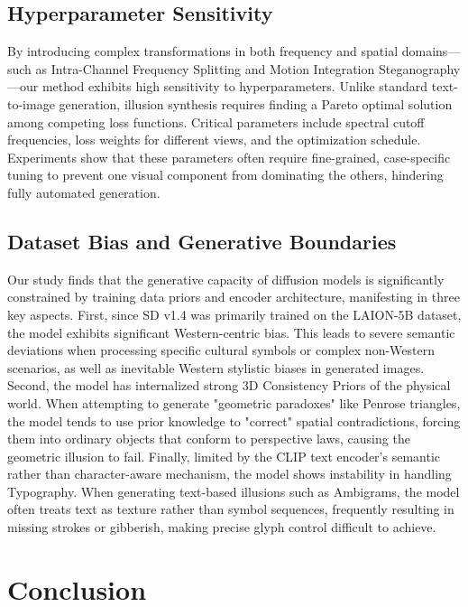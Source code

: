 \documentclass{article}
\begin{document}
\subsection{Hyperparameter Sensitivity}

By introducing complex transformations in both frequency and spatial domains—such as Intra-Channel Frequency Splitting and Motion Integration Steganography—our method exhibits high sensitivity to hyperparameters. Unlike standard text-to-image generation, illusion synthesis requires finding a Pareto optimal solution among competing loss functions. Critical parameters include spectral cutoff frequencies, loss weights for different views, and the optimization schedule. Experiments show that these parameters often require fine-grained, case-specific tuning to prevent one visual component from dominating the others, hindering fully automated generation.

\subsection{Dataset Bias and Generative Boundaries}

Our study finds that the generative capacity of diffusion models is significantly constrained by training data priors and encoder architecture, manifesting in three key aspects. First, since SD v1.4 was primarily trained on the LAION-5B dataset, the model exhibits significant Western-centric bias. This leads to severe semantic deviations when processing specific cultural symbols or complex non-Western scenarios, as well as inevitable Western stylistic biases in generated images. Second, the model has internalized strong 3D Consistency Priors of the physical world. When attempting to generate "geometric paradoxes" like Penrose triangles\cite{dodik2025meschers}, the model tends to use prior knowledge to "correct" spatial contradictions, forcing them into ordinary objects that conform to perspective laws, causing the geometric illusion to fail. Finally, limited by the CLIP text encoder's semantic rather than character-aware mechanism, the model shows instability in handling Typography. When generating text-based illusions such as Ambigrams, the model often treats text as texture rather than symbol sequences, frequently resulting in missing strokes or gibberish, making precise glyph control difficult to achieve.

\section{Conclusion}
\end{document}
